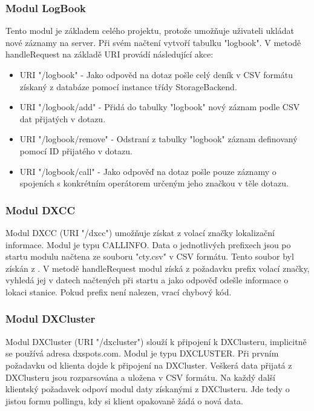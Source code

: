 \subsubsection{Modul LogBook}

Tento modul je základem celého projektu, protože umožňuje uživateli ukládat nové záznamy na server. Při svém načtení
vytvoří tabulku "logbook". V metodě handleRequest na základě URI provádí následující akce:

\begin{itemize}
\item URI "/logbook" - Jako odpověd na dotaz pošle celý deník %
v CSV formátu získaný z databáze pomocí instance třídy StorageBackend.
\item URI "/logbook/add" - Přidá do tabulky "logbook" nový záznam podle CSV dat přijatých v dotazu.
\item URI "/logbook/remove" - Odstraní z tabulky "logbook" záznam definovaný pomocí ID přijatého v dotazu.
\item URI "/logbook/call" - Jako odpověď na dotaz pošle pouze záznamy o spojeních s konkrétním operátorem určeným jeho značkou v 
těle dotazu.
\end{itemize}

\subsubsection{Modul DXCC}

Modul DXCC (URI "/dxcc") umožňuje získat z volací značky lokalizační informace. Modul je typu CALLINFO.
Data o jednotlivých prefixech
jsou po startu modulu načtena ze souboru "cty.csv" v CSV formátu. Tento soubor
byl získán z \cite{cty.csv}. %
V metodě handleRequest modul získá z požadavku prefix volací
značky, vyhledá jej v datech načtených při startu %
a jako odpověď odešle informace o lokaci stanice. Pokud prefix není nalezen,
vrací chybový kód.

\subsubsection{Modul DXCluster}

Modul DXCluster (URI "/dxcluster") slouží k připojení k DXClusteru, implicitně
se používá adresa dxspots.com. Modul je typu DXCLUSTER.
Při prvním požadavku od klienta dojde k připojení na DXCluster.
Veškerá data přijatá z DXClusteru jsou rozparsována a uložena v CSV formátu. Na každý
další klientský požadavek odpoví modul daty získanými z DXClusteru. Jde tedy o jistou formu pollingu, kdy si klient
opakovaně žádá o nová data.

